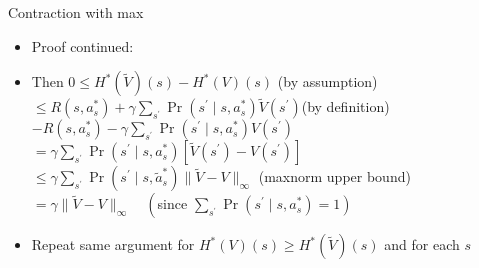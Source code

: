 \documentclass[11pt,table]{beamer}
\begin{document}
\begin{frame}{Contraction with max}

    \begin{itemize}
        \item Proof continued:

\item Then $0 \leq H^{*}(\tilde{V})(s)-H^{*}(V)(s)$ \quad(by assumption)\\[2ex]

$\leq R\left(s, a_{s}^{*}\right)+\gamma \sum_{s^{\prime}} \operatorname{Pr}\left(s^{\prime} \mid s, a_{s}^{*}\right) \tilde{V}\left(s^{\prime}\right)$\quad(by definition)\\[2ex]

$-R\left(s, a_{s}^{*}\right)-\gamma \sum_{s^{\prime}} \operatorname{Pr}\left(s^{\prime} \mid s, a_{s}^{*}\right) V\left(s^{\prime}\right)$\\[2ex]

$=\gamma \sum_{s^{\prime}}\operatorname{Pr}\left(s^{\prime} \mid s, a_{s}^{*}\right) [\tilde{V}(s^{\prime})-V(s^{\prime})]$\\[2ex]

$ \leq \gamma \sum_{s^{\prime}} \operatorname{Pr}\left(s^{\prime} \mid s, \tilde{a}_{s}^{*}\right)\|\tilde{V}-V\|_{\infty}$ \quad (maxnorm upper bound)\\[2ex]

$=\gamma\|\tilde{V}-V\|_{\infty} \quad\left(\right.$since $\left.\sum_{s^{\prime}} \operatorname{Pr}\left(s^{\prime} \mid s, a_{s}^{*}\right)=1\right)$\\[2ex]

\item Repeat same argument for $H^{*}(V)(s) \geq H^{*}(\tilde{V})(s)$ and for each $s$ 
   \end{itemize} 
\end{frame}
\end{document}
